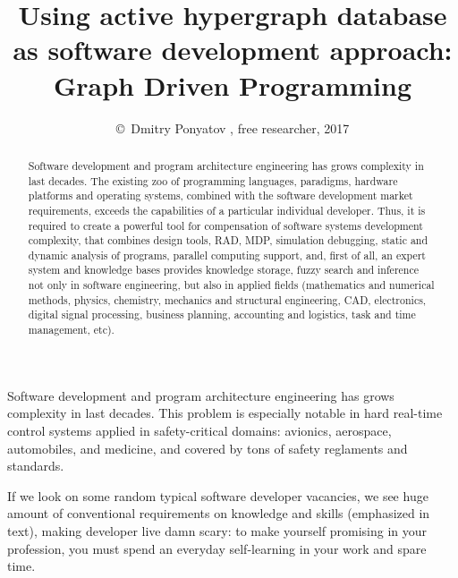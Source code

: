 

\title{
Using active hypergraph database\\
as software development approach:\\
\Huge{Graph Driven Programming}}

\author{\small{\copyright\ Dmitry Ponyatov , free researcher, 2017}}


\maketitle
\tableofcontents

\begin{abstract}\noindent
Software development and program architecture engineering has grows complexity in last decades. The existing zoo of programming languages, para\-digms, hardware platforms and operating systems, combined with the software development market requirements, exceeds the capabilities of a particular individual developer. Thus, it is required to create a powerful tool for compensation of software systems development complexity, that combines design tools, RAD, MDP, simulation debugging, static and dynamic analysis of programs, parallel computing support, and, first of all, an expert system and knowledge bases provides knowledge storage, fuzzy search and inference not only in software engineering, but also in applied fields (mathematics and numerical methods, physics, chemistry, mechanics and structural engineering, CAD, electronics, digital signal processing, business planning, accounting and logistics, task and time management, etc).
\end{abstract}


Software development and program architecture engineering has grows complexity in last decades. This problem is especially notable in hard real-time control systems applied in safety-critical domains: avionics, aerospace, automobiles, and medicine, and covered by tons of safety reglaments and standards. \cite{book1}

If we look on some random typical software developer vacancies, we see huge amount of conventional requirements on knowledge and skills (emphasized in text), making developer live damn scary: to make yourself promising in your profession, you must spend an everyday self-learning in your work and spare time.


